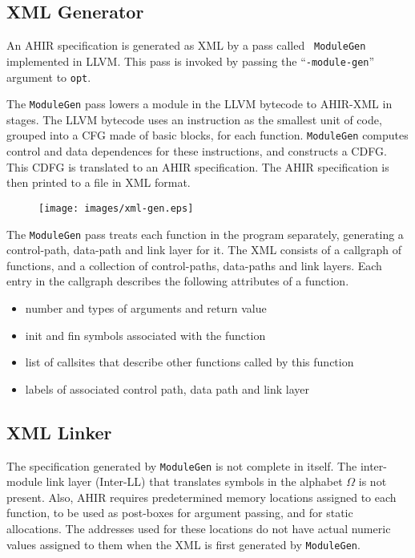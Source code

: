 \documentclass[12pt]{article}
\begin{document}
\subsection{XML Generator}

An AHIR specification is generated as XML by a pass called {\tt
ModuleGen} implemented in LLVM. This pass is invoked by passing the
``{\tt -module-gen}'' argument to {\tt opt}.

The {\tt ModuleGen} pass lowers a module in the LLVM bytecode to
AHIR-XML in stages. The LLVM bytecode uses an instruction as the
smallest unit of code, grouped into a CFG made of basic blocks, for
each function. {\tt ModuleGen} computes control and data dependences
for these instructions, and constructs a CDFG. This CDFG is translated
to an AHIR specification. The AHIR specification is then printed to a
file in XML format.

\begin{figure}[htb]
\centering
\texttt{[image: images/xml-gen.eps]}
\end{figure}

The {\tt ModuleGen} pass treats each function in the program
separately, generating a control-path, data-path and link layer for
it. The XML consists of a callgraph of functions, and a collection of
control-paths, data-paths and link layers. Each entry in the callgraph
describes the following attributes of a function.

\begin{itemize}
\item number and types of arguments and return value
\item init and fin symbols associated with the function
\item list of callsites that describe other functions called by this
      function
\item labels of associated control path, data path and link layer
\end{itemize}

\subsection{XML Linker}

The specification generated by {\tt ModuleGen} is not complete in
itself. The inter-module link layer (Inter-LL) that translates symbols
in the alphabet $\Omega$ is not present. Also, AHIR requires
predetermined memory locations assigned to each function, to be used
as post-boxes for argument passing, and for static allocations. The
addresses used for these locations do not have actual numeric values
assigned to them when the XML is first generated by {\tt ModuleGen}.
\end{document}
